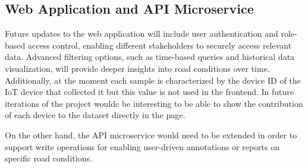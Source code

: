 \subsection{Web Application and API Microservice}

Future updates to the web application will include user authentication and role-based access control, enabling different stakeholders to securely access relevant data. Advanced filtering options, such as time-based queries and historical data visualization, will provide deeper insights into road conditions over time. Additionally, at the moment each sample is characterized by the device ID of the IoT device that collected it but this value is not used in the frontend. In future iterations of the project wouldc be interesting to be able to show the contribution of each device to the dataset directly in the page.

On the other hand, the API microservice would need to be extended in order to support write operations for enabling user-driven annotations or reports on specific road conditions.

